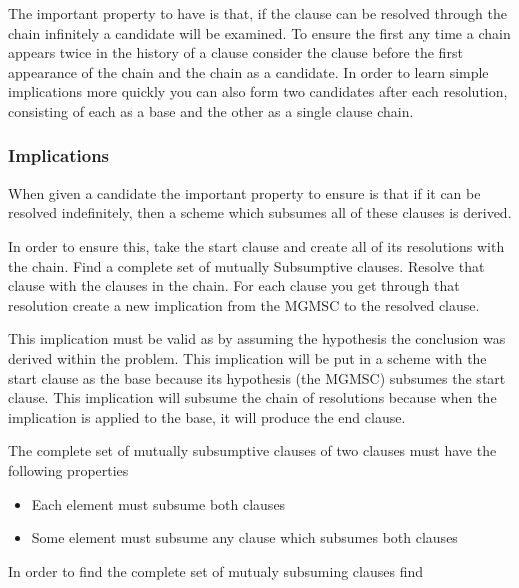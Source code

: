 \documentclass{article}
\begin{document}
The important property to have is that,
if the clause can be resolved through the chain infinitely a candidate will be examined.
To ensure the first any time a chain appears twice in the history of a clause
consider the clause before the first appearance of the chain and the chain as a candidate.
In order to learn simple implications more quickly you can also form two candidates after each resolution,
consisting of each as a base and the other as a single clause chain.

\subsubsection{Implications}

When given a candidate the important property to ensure is that if it can be resolved indefinitely,
then a scheme which subsumes all of these clauses is derived.

In order to ensure this, take the start clause and create all of its resolutions with the chain.
Find a complete set of mutually Subsumptive clauses.
Resolve that clause with the clauses in the chain.
For each clause you get through that resolution create a new implication from the MGMSC to the resolved clause.

This implication must be valid as by assuming the hypothesis the conclusion was derived within the problem.
This implication will be put in a scheme with the start clause as the base because its hypothesis (the MGMSC) subsumes the start clause.
This implication will subsume the chain of resolutions because when the implication is applied to the base,
  it will produce the end clause.

The complete set of mutually subsumptive clauses of two clauses must have the following properties
\begin{itemize}
  \item Each element must subsume both clauses
  \item Some element must subsume any clause which subsumes both clauses
\end{itemize}



In order to find the complete set of mutualy subsuming clauses find
\end{document}
